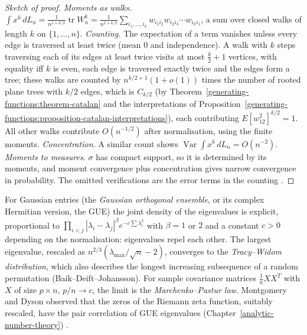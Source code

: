 \begin{proof}[Sketch of proof]
\emph{Moments as walks.} $\int x^k\,dL_n = \frac{1}{n^{1+k/2}}\operatorname{tr}W_n^k = \frac{1}{n^{1+k/2}}\sum_{i_1, \ldots, i_k}w_{i_1i_2}w_{i_2i_3}\cdots w_{i_ki_1}$, a sum over closed walks of length $k$ on $\{1, \ldots, n\}$. \emph{Counting.} The
expectation of a term vanishes unless every edge is traversed at least twice (mean $0$ and independence). A walk with $k$ steps traversing each of its edges at least twice visits at most $\frac k2 + 1$ vertices, with equality iff
$k$ is even, each edge is traversed exactly twice and the edges form a tree; these walks are counted by $n^{k/2+1}(1 + o(1))$ times the number of rooted plane trees with $k/2$ edges, which is $C_{k/2}$ (by
Theorem~\ref{generating-functions:theorem-catalan} and the interpretations of Proposition~\ref{generating-functions:proposition-catalan-interpretations}), each contributing $E[w_{12}^2]^{k/2} = 1$. All other walks contribute $O(n^{-1/2})$
after normalisation, using the finite moments. \emph{Concentration.} A similar count shows $\operatorname{Var}\int x^k\,dL_n = O(n^{-2})$. \emph{Moments to measures.} $\sigma$ has compact support, so it is determined by its moments,
and moment convergence plus concentration gives narrow convergence in probability. The omitted verifications are the error terms in the counting \cite{anderson-guionnet-zeitouni}.
\end{proof}

\begin{remark}\label{probability:remark-random-matrices}
For Gaussian entries (the \emph{Gaussian orthogonal ensemble}, or its complex Hermitian version, the GUE) the joint density of the eigenvalues is explicit, proportional to $\prod_{i<j}|\lambda_i - \lambda_j|^\beta e^{-c\sum\lambda_i^2}$
with $\beta = 1$ or $2$ and a constant $c > 0$ depending on the normalisation: eigenvalues repel each other. The largest eigenvalue, rescaled as $n^{2/3}(\lambda_{\max}/\sqrt n - 2)$, converges to the \emph{Tracy--Widom distribution}, which also describes the longest increasing
subsequence of a random permutation (Baik--Deift--Johansson). For sample covariance matrices $\frac1nXX^T$ with $X$ of size $p \times n$, $p/n \to c$, the limit is the \emph{Marchenko--Pastur law}. Montgomery and Dyson observed that
the zeros of the Riemann zeta function, suitably rescaled, have the pair correlation of GUE eigenvalues (Chapter~\ref{analytic-number-theory}) \cite{anderson-guionnet-zeitouni}.
\end{remark}

